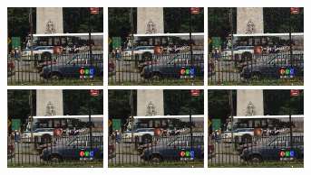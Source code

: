 \documentclass[10pt, journal, twocolumn, final, a4paper]{IEEEtran}
\begin{document}
\begin{figure}[thpb!]
	\begin{center}
		\includegraphics[trim=0.0cm 2.0cm 4.0cm 1.0cm, clip=true, width=0.25\textwidth]{figs/bus_nisy_s10_044.png}
		\includegraphics[trim=0.0cm 2.0cm 4.0cm 1.0cm, clip=true, width=0.25\textwidth]{figs/bus_nisy_s20_044.png}
		\includegraphics[trim=0.0cm 2.0cm 4.0cm 1.0cm, clip=true, width=0.25\textwidth]{figs/bus_nisy_s40_044.png}\\
		\includegraphics[trim=0.0cm 2.0cm 4.0cm 1.0cm, clip=true, width=0.25\textwidth]{figs/bus_vnlb_s10_tr2_044.png}
		\includegraphics[trim=0.0cm 2.0cm 4.0cm 1.0cm, clip=true, width=0.25\textwidth]{figs/bus_vnlb_s20_tr2_044.png}
		\includegraphics[trim=0.0cm 2.0cm 4.0cm 1.0cm, clip=true, width=0.25\textwidth]{figs/bus_vnlb_s40_tr2_044.png}\\

\end{center}
\end{figure}
\end{document}
